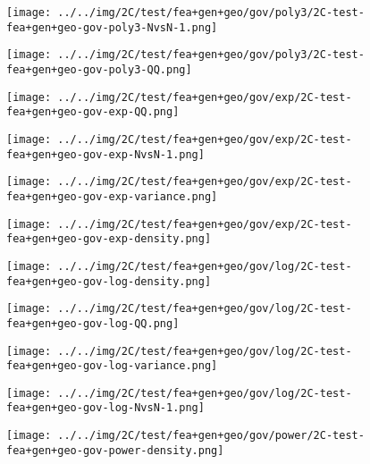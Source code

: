 \begin{figure}[H]
\centering	\texttt{[image: ../../img/2C/test/fea+gen+geo/gov/poly3/2C-test-fea+gen+geo-gov-poly3-NvsN-1.png]}
\end{figure}
\begin{figure}[H]
\centering	\texttt{[image: ../../img/2C/test/fea+gen+geo/gov/poly3/2C-test-fea+gen+geo-gov-poly3-QQ.png]}
\end{figure}
\begin{figure}[H]
\centering	\texttt{[image: ../../img/2C/test/fea+gen+geo/gov/exp/2C-test-fea+gen+geo-gov-exp-QQ.png]}
\end{figure}
\begin{figure}[H]
\centering	\texttt{[image: ../../img/2C/test/fea+gen+geo/gov/exp/2C-test-fea+gen+geo-gov-exp-NvsN-1.png]}
\end{figure}
\begin{figure}[H]
\centering	\texttt{[image: ../../img/2C/test/fea+gen+geo/gov/exp/2C-test-fea+gen+geo-gov-exp-variance.png]}
\end{figure}
\begin{figure}[H]
\centering	\texttt{[image: ../../img/2C/test/fea+gen+geo/gov/exp/2C-test-fea+gen+geo-gov-exp-density.png]}
\end{figure}
\begin{figure}[H]
\centering	\texttt{[image: ../../img/2C/test/fea+gen+geo/gov/log/2C-test-fea+gen+geo-gov-log-density.png]}
\end{figure}
\begin{figure}[H]
\centering	\texttt{[image: ../../img/2C/test/fea+gen+geo/gov/log/2C-test-fea+gen+geo-gov-log-QQ.png]}
\end{figure}
\begin{figure}[H]
\centering	\texttt{[image: ../../img/2C/test/fea+gen+geo/gov/log/2C-test-fea+gen+geo-gov-log-variance.png]}
\end{figure}
\begin{figure}[H]
\centering	\texttt{[image: ../../img/2C/test/fea+gen+geo/gov/log/2C-test-fea+gen+geo-gov-log-NvsN-1.png]}
\end{figure}
\begin{figure}[H]
\centering	\texttt{[image: ../../img/2C/test/fea+gen+geo/gov/power/2C-test-fea+gen+geo-gov-power-density.png]}
\end{figure}
